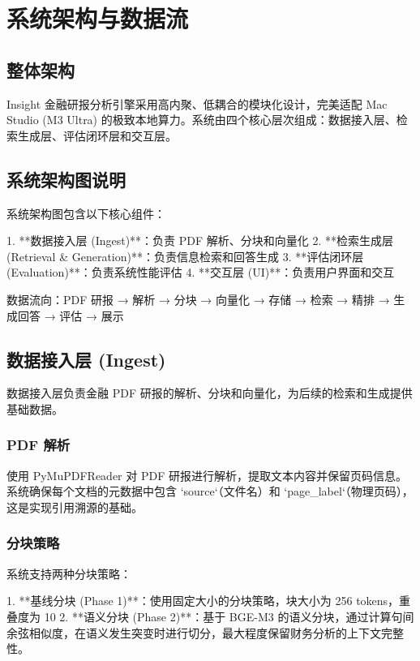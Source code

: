 \section{系统架构与数据流}

\subsection{整体架构}

Insight 金融研报分析引擎采用高内聚、低耦合的模块化设计，完美适配 Mac Studio (M3 Ultra)
的极致本地算力。系统由四个核心层次组成：数据接入层、检索生成层、评估闭环层和交互层。

\subsection{系统架构图说明}

系统架构图包含以下核心组件：

1. **数据接入层 (Ingest)**：负责 PDF 解析、分块和向量化
2. **检索生成层 (Retrieval \& Generation)**：负责信息检索和回答生成
3. **评估闭环层 (Evaluation)**：负责系统性能评估
4. **交互层 (UI)**：负责用户界面和交互

数据流向：PDF 研报 → 解析 → 分块 → 向量化 → 存储 → 检索 → 精排 → 生成回答 → 评估 → 展示

\subsection{数据接入层 (Ingest)}

数据接入层负责金融 PDF 研报的解析、分块和向量化，为后续的检索和生成提供基础数据。

\subsubsection{PDF 解析}
使用 PyMuPDFReader 对 PDF 研报进行解析，提取文本内容并保留页码信息。系统确保每个文档的元数据中包含 `source`（文件名）和 `page\_label`（物理页码），这是实现引用溯源的基础。

\subsubsection{分块策略}
系统支持两种分块策略：

1. **基线分块 (Phase 1)**：使用固定大小的分块策略，块大小为 256 tokens，重叠度为 10%
2. **语义分块 (Phase 2)**：基于 BGE-M3 的语义分块，通过计算句间余弦相似度，在语义发生突变时进行切分，最大程度保留财务分析的上下文完整性。

